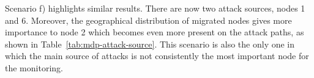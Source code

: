 Scenario f) highlights similar results. There are now two attack sources, nodes 1 and 6. Moreover, the geographical distribution of migrated nodes gives more importance to node 2 which becomes even more present on the attack paths, as shown in Table~\ref{tab:mdp-attack-source}. This scenario is also the only one in which the main source of attacks is not consistently the most important node for the monitoring.








